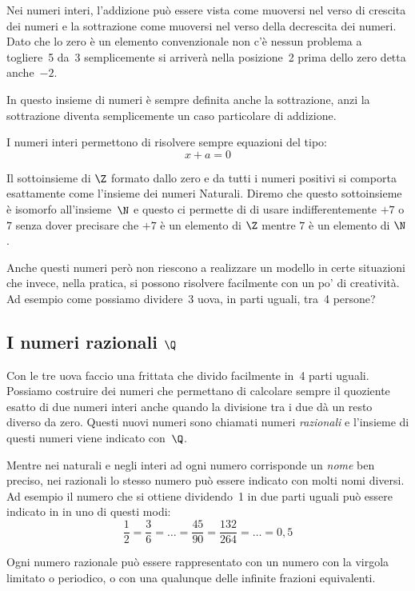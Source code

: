 Nei numeri interi, l'addizione può essere vista come muoversi nel verso 
di crescita dei numeri e la sottrazione come muoversi nel verso della 
decrescita dei numeri. Dato che lo zero è un elemento convenzionale non c'è 
nessun problema a togliere~5 da~3 semplicemente si arriverà nella 
posizione~2 prima dello zero detta anche~\(-2\).

In questo insieme di numeri è sempre definita anche la sottrazione, anzi la 
sottrazione diventa semplicemente un caso particolare di addizione.

I numeri interi permettono di risolvere sempre equazioni del tipo:
\[x+a=0\]

Il sottoinsieme di \(\Z\) formato dallo zero e da tutti i numeri positivi
si comporta esattamente come l'insieme dei numeri Naturali. Diremo che 
questo sottoinsieme è isomorfo all'insieme~\(\N\) 
e questo ci permette di di usare indifferentemente \(+7\) o \(7\) 
senza dover precisare che \(+7\) è un elemento di \(\Z\) 
mentre \(7\) è un elemento di \(\N\).

Anche questi numeri però non riescono a realizzare un modello in certe 
situazioni che invece, nella pratica, si possono risolvere facilmente con un 
po' di creatività. Ad esempio come possiamo dividere~3 uova, in parti 
uguali, tra~4 persone?

\subsection{I numeri razionali \(\Q\)}
\label{subsec:insnum_razionali}

Con le tre uova faccio una frittata che divido facilmente in~4 parti 
uguali. 
Possiamo costruire dei numeri che permettano di calcolare sempre il 
quoziente esatto di due numeri interi anche quando la divisione tra i due 
dà un resto diverso da zero. 
Questi nuovi numeri sono chiamati numeri \emph{razionali} 
e l'insieme di questi numeri viene indicato con~\(\Q\).

Mentre nei naturali e negli interi ad ogni numero corrisponde un 
\emph{nome} ben preciso, nei razionali lo stesso numero può essere indicato 
con molti nomi diversi. 
Ad esempio il numero che si ottiene dividendo~1 in due parti 
uguali può essere indicato in in uno di questi modi:
\[\frac{1}{2}=\frac{3}{6}=\dots=\frac{45}{90}=\frac{132}{264}=\dots=0,5\]

Ogni numero razionale può essere rappresentato con un numero con la virgola 
limitato o periodico, o con una qualunque delle infinite frazioni equivalenti.

